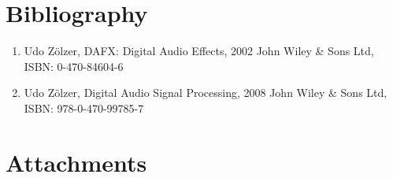 \documentclass{article}
\begin{document}
\newpage



\section{Bibliography}
\begin{enumerate}
    \item Udo Zölzer, DAFX: Digital Audio Effects, 2002 John Wiley \& Sons Ltd, ISBN: 0-470-84604-6
    \item Udo Zölzer, Digital Audio Signal Processing, 2008 John Wiley \& Sons Ltd, ISBN: 978-0-470-99785-7
\end{enumerate}
\newpage



\section{Attachments}

\newpage
\end{document}
